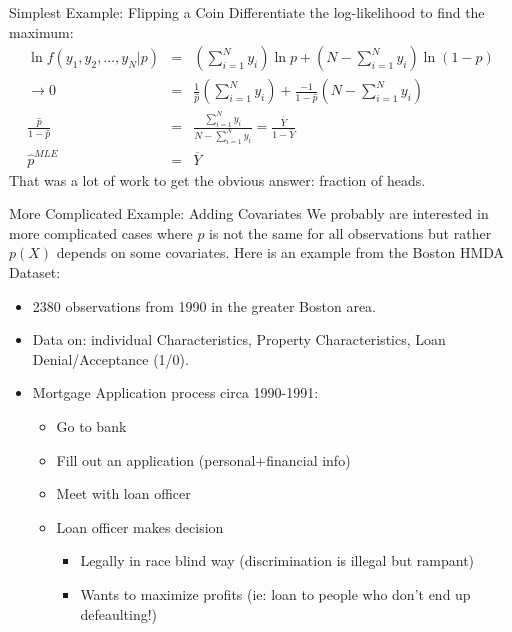 \documentclass[aspectratio=169]{beamer}
\begin{document}
\begin{frame}{Simplest Example: Flipping a Coin}
Differentiate the log-likelihood to find the maximum:
\begin{eqnarray*}
\ln  f(y_1,y_2,\ldots,y_N | p )  &=& \left( \sum_{i=1}^N y_i \right)  \ln p  + \left(N-\sum_{i=1}^N y_i \right)  \ln(1-p)\\
\rightarrow 0&=& \frac{1}{\hat{p}}  \left( \sum_{i=1}^N y_i \right) + \frac{-1}{1-\hat{p}}   \left(N-\sum_{i=1}^N y_i \right) \\
 \frac{\hat{p}}{1-\hat{p}} &=& \frac{\sum_{i=1}^N y_i }{N- \sum_{i=1}^N y_i } = \frac{\overline{Y}}{1-\overline{Y}} \\
\hat{p}^{MLE} &=& \overline{Y}
\end{eqnarray*}
That was a lot of work to get the obvious answer: \alert{fraction of heads}.
\end{frame}

\begin{frame}{More Complicated Example: Adding Covariates}
We probably are interested in more complicated cases where $p$ is not the same for all observations but rather $p(X)$ depends on some covariates. Here is an example from the Boston HMDA Dataset:
\begin{itemize}
\item 2380 observations from 1990 in the greater Boston area.
\item Data on: individual Characteristics, Property Characteristics, Loan Denial/Acceptance (1/0).
\item Mortgage Application process circa 1990-1991:
\begin{itemize}
\item Go to bank
\item Fill out an application (personal+financial info)
\item Meet with loan officer
\item Loan officer makes decision
\begin{itemize}
\item Legally in race blind way (discrimination is illegal but rampant)
\item Wants to maximize profits (ie: loan to people who don't end up defeaulting!)
\end{itemize}
\end{itemize}
\end{itemize}
\end{frame}
\end{document}
